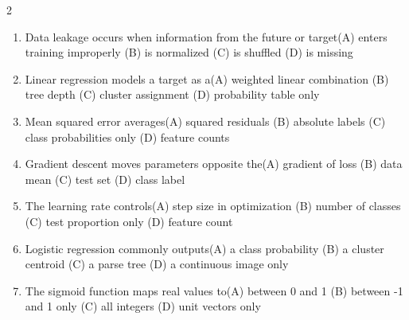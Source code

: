 \documentclass[a4paper]{article}
\begin{document}
\begin{multicols*}{2}
\begin{enumerate}
\item Data leakage occurs when information from the future or target\newline\hspace*{0.6em}(A) enters training improperly \quad (B) is normalized \newline\hspace*{0.6em}(C) is shuffled \quad (D) is missing
\item Linear regression models a target as a\newline\hspace*{0.6em}(A) weighted linear combination \quad (B) tree depth \newline\hspace*{0.6em}(C) cluster assignment \quad (D) probability table only
\item Mean squared error averages\newline\hspace*{0.6em}(A) squared residuals \quad (B) absolute labels \newline\hspace*{0.6em}(C) class probabilities only \quad (D) feature counts
\item Gradient descent moves parameters opposite the\newline\hspace*{0.6em}(A) gradient of loss \quad (B) data mean \newline\hspace*{0.6em}(C) test set \quad (D) class label
\item The learning rate controls\newline\hspace*{0.6em}(A) step size in optimization \quad (B) number of classes \newline\hspace*{0.6em}(C) test proportion only \quad (D) feature count
\item Logistic regression commonly outputs\newline\hspace*{0.6em}(A) a class probability \quad (B) a cluster centroid \newline\hspace*{0.6em}(C) a parse tree \quad (D) a continuous image only
\item The sigmoid function maps real values to\newline\hspace*{0.6em}(A) between 0 and 1 \quad (B) between -1 and 1 only \newline\hspace*{0.6em}(C) all integers \quad (D) unit vectors only

\end{enumerate}
\end{multicols*}
\end{document}
